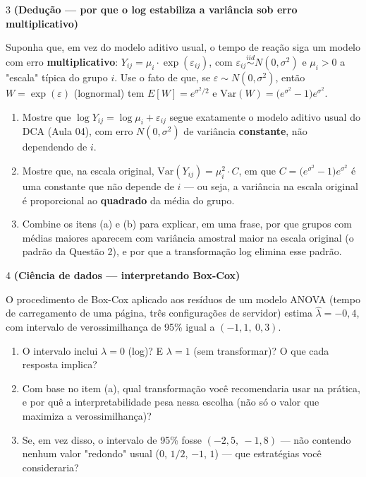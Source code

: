 \documentclass[11pt]{article}
\begin{document}
\begin{questao}{3} \textbf{(Dedução --- por que o log estabiliza a variância sob erro multiplicativo)}

Suponha que, em vez do modelo aditivo usual, o tempo de reação siga um modelo com erro
\textbf{multiplicativo}: $Y_{ij} = \mu_i \cdot \exp(\varepsilon_{ij})$, com $\varepsilon_{ij}
\overset{iid}{\sim} N(0,\sigma^2)$ e $\mu_i > 0$ a "escala" típica do grupo $i$. Use o fato de
que, se $\varepsilon \sim N(0,\sigma^2)$, então $W=\exp(\varepsilon)$ (lognormal) tem $E[W] =
e^{\sigma^2/2}$ e $\mathrm{Var}(W) = \big(e^{\sigma^2}-1\big)e^{\sigma^2}$.

\begin{enumerate}[label=(\alph*)]
  \item Mostre que $\log Y_{ij} = \log\mu_i + \varepsilon_{ij}$ segue exatamente o modelo aditivo
    usual do DCA (Aula 04), com erro $N(0,\sigma^2)$ de variância \textbf{constante}, não
    dependendo de $i$.
  \item Mostre que, na escala original, $\mathrm{Var}(Y_{ij}) = \mu_i^2 \cdot C$, em que $C =
    \big(e^{\sigma^2}-1\big)e^{\sigma^2}$ é uma constante que não depende de $i$ --- ou seja, a
    variância na escala original é proporcional ao \textbf{quadrado} da média do grupo.
  \item Combine os itens (a) e (b) para explicar, em uma frase, por que grupos com médias maiores
    aparecem com variância amostral maior na escala original (o padrão da Questão 2), e por que a
    transformação log elimina esse padrão.
\end{enumerate}
\end{questao}

\begin{questao}{4} \textbf{(Ciência de dados --- interpretando Box-Cox)}

O procedimento de Box-Cox aplicado aos resíduos de um modelo ANOVA (tempo de carregamento de uma
página, três configurações de servidor) estima $\hat\lambda = -0{,}4$, com intervalo de
verossimilhança de 95\% igual a $(-1{,}1,\ 0{,}3)$.

\begin{enumerate}[label=(\alph*)]
  \item O intervalo inclui $\lambda=0$ (log)? E $\lambda=1$ (sem transformar)? O que cada resposta
    implica?
  \item Com base no item (a), qual transformação você recomendaria usar na prática, e por quê a
    interpretabilidade pesa nessa escolha (não só o valor que maximiza a verossimilhança)?
  \item Se, em vez disso, o intervalo de 95\% fosse $(-2{,}5,\ -1{,}8)$ --- não contendo nenhum
    valor "redondo" usual ($0$, $1/2$, $-1$, $1$) --- que estratégias você consideraria?
\end{enumerate}
\end{questao}
\end{document}
